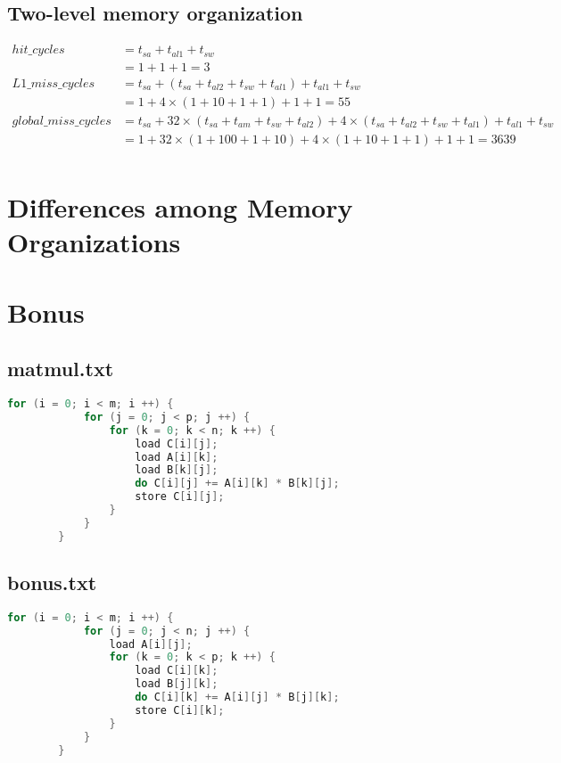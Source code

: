 \documentclass[12pt, a4paper]{article}
\begin{document}
\begin{CJK*}{UTF8}{bsmi}
        \subsection{Two-level memory organization}
            $
            \begin{aligned} 
            hit\_cycles         & = t_{sa} + t_{al1} + t_{sw} \\ 
                               & = 1 + 1 + 1 = 3 \\
            L1\_miss\_cycles     & = t_{sa} + (t_{sa} + t_{al2} + t_{sw} + t_{al1}) + t_{al1} + t_{sw} \\
                               & = 1 + 4 \times (1 + 10 + 1 + 1) + 1 + 1 = 55 \\
            global\_miss\_cycles & = t_{sa} + 32 \times (t_{sa} + t_{am} + t_{sw} + t_{al2}) + 4 \times (t_{sa} + t_{al2} + t_{sw} + t_{al1}) + t_{al1} + t_{sw} \\
                               & = 1 + 32 \times (1 + 100 + 1 + 10) + 4 \times (1 + 10 + 1 + 1) + 1 + 1 = 3639 \\
            \end{aligned} 
            $
    \newpage
    \section{Differences among Memory Organizations}

    \section{Bonus}
        \subsection{matmul.txt} 
        \begin{lstlisting}[language=C++]
        for (i = 0; i < m; i ++) {
            for (j = 0; j < p; j ++) {
                for (k = 0; k < n; k ++) {
                    load C[i][j];
                    load A[i][k];
                    load B[k][j];
                    do C[i][j] += A[i][k] * B[k][j];
                    store C[i][j];
                }
            }
        }
        \end{lstlisting}

        \subsection{bonus.txt} 
        \begin{lstlisting}[language=C++]
        for (i = 0; i < m; i ++) {
            for (j = 0; j < n; j ++) {
                load A[i][j];
                for (k = 0; k < p; k ++) {
                    load C[i][k];
                    load B[j][k];
                    do C[i][k] += A[i][j] * B[j][k];
                    store C[i][k];
                }
            }
        }
        \end{lstlisting}

    \end{CJK*}
\end{document}
